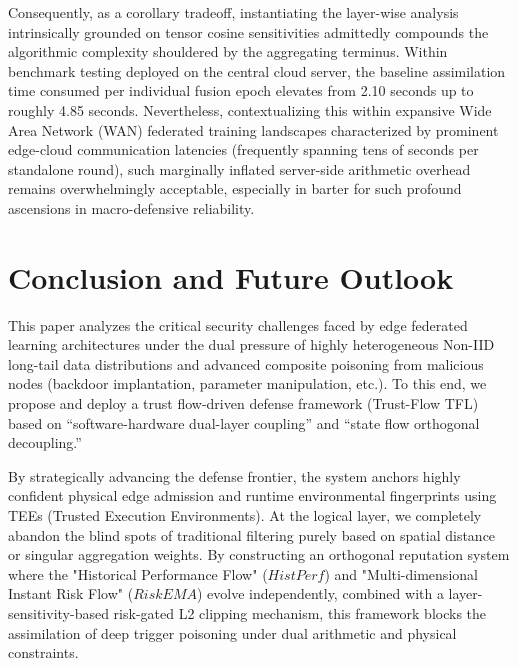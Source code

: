 \documentclass[runningheads]{llncs}
\begin{document}
\begin{table}[htbp]
\centering
\caption{End-to-Cloud Overhead Comparison among Federated Variations (20 Clients)}
\vspace{4pt}
\label{tab:overhead}
\end{table}

Consequently, as a corollary tradeoff, instantiating the layer-wise analysis intrinsically grounded on tensor cosine sensitivities admittedly compounds the algorithmic complexity shouldered by the aggregating terminus. Within benchmark testing deployed on the central cloud server, the baseline assimilation time consumed per individual fusion epoch elevates from 2.10 seconds up to roughly 4.85 seconds. Nevertheless, contextualizing this within expansive Wide Area Network (WAN) federated training landscapes characterized by prominent edge-cloud communication latencies (frequently spanning tens of seconds per standalone round), such marginally inflated server-side arithmetic overhead remains overwhelmingly acceptable, especially in barter for such profound ascensions in macro-defensive reliability.

\section{Conclusion and Future Outlook}
This paper analyzes the critical security challenges faced by edge federated learning architectures under the dual pressure of highly heterogeneous Non-IID long-tail data distributions and advanced composite poisoning from malicious nodes (backdoor implantation, parameter manipulation, etc.). To this end, we propose and deploy a trust flow-driven defense framework (Trust-Flow TFL) based on ``software-hardware dual-layer coupling'' and ``state flow orthogonal decoupling.''

By strategically advancing the defense frontier, the system anchors highly confident physical edge admission and runtime environmental fingerprints using TEEs (Trusted Execution Environments). At the logical layer, we completely abandon the blind spots of traditional filtering purely based on spatial distance or singular aggregation weights. By constructing an orthogonal reputation system where the "Historical Performance Flow" ($HistPerf$) and "Multi-dimensional Instant Risk Flow" ($RiskEMA$) evolve independently, combined with a layer-sensitivity-based risk-gated L2 clipping mechanism, this framework blocks the assimilation of deep trigger poisoning under dual arithmetic and physical constraints.
\end{document}
